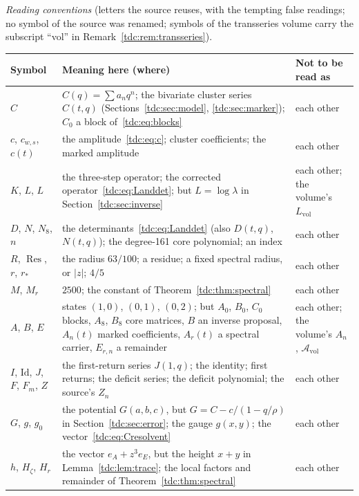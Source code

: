 \documentclass[11pt]{article}
\theoremstyle{definition}\newtheorem{definition}[theorem]{Definition}
\theoremstyle{remark}\newtheorem{remark}[theorem]{Remark}
\newcommand{\Id}{\mathrm{Id}}
\DeclareMathOperator{\Res}{Res}
\begin{document}
\medskip
\begingroup\small
\noindent\emph{Reading conventions} (letters the source reuses, with the
tempting false readings; no symbol of the source was renamed; symbols of the
transseries volume carry the subscript ``vol'' in
Remark~\ref{tdc:rem:transseries}).\par\smallskip
\renewcommand{\arraystretch}{1.1}
\begin{longtable}{@{}>{\raggedright\arraybackslash}p{0.95in}>{\raggedright\arraybackslash}p{3.3in}>{\raggedright\arraybackslash}p{1.85in}@{}}
\toprule
Symbol & Meaning here (where) & Not to be read as\\
\midrule
\endhead
$C$ & $C(q)=\sum a_nq^n$; the bivariate cluster series $C(t,q)$ (Sections~\ref{tdc:sec:model}, \ref{tdc:sec:marker}); $C_0$ a block of~\eqref{tdc:eq:blocks} & each other\\
$c$, $c_{w,s}$, $c(t)$ & the amplitude~\eqref{tdc:eq:c}; cluster coefficients; the marked amplitude & each other\\
$K$, $L$, $L$ & the three-step operator; the corrected operator~\eqref{tdc:eq:Landdet}; but $L=\log\lambda$ in Section~\ref{tdc:sec:inverse} & each other; the volume's $L_{\mathrm{vol}}$\\
$D$, $N$, $N_8$, $n$ & the determinants~\eqref{tdc:eq:Landdet} (also $D(t,q)$, $N(t,q)$); the degree-161 core polynomial; an index & each other\\
$R$, $\Res$, $r$, $r_*$ & the radius $63/100$; a residue; a fixed spectral radius, or $|z|$; $4/5$ & each other\\
$M$, $M_r$ & $2500$; the constant of Theorem~\ref{tdc:thm:spectral} & each other\\
$A$, $B$, $E$ & states $(1,0)$, $(0,1)$, $(0,2)$; but $A_0$, $B_0$, $C_0$ blocks, $A_8$, $B_8$ core matrices, $B$ an inverse proposal, $A_n(t)$ marked coefficients, $A_r(t)$ a spectral carrier, $E_{r,n}$ a remainder & each other; the volume's $A_n$, $\mathcal A_{\mathrm{vol}}$\\
$I$, $\Id$, $J$, $F$, $F_m$, $Z$ & the first-return series $J(1,q)$; the identity; first returns; the deficit series; the deficit polynomial; the source's $Z_n$ & each other\\
$G$, $g$, $g_0$ & the potential $G(a,b,c)$, but $G=C-c/(1-q/\rho)$ in Section~\ref{tdc:sec:error}; the gauge $g(x,y)$; the vector~\eqref{tdc:eq:Cresolvent} & each other\\
$h$, $H_\zeta$, $H_r$ & the vector $e_A+z^3e_E$, but the height $x+y$ in Lemma~\ref{tdc:lem:trace}; the local factors and remainder of Theorem~\ref{tdc:thm:spectral} & each other\\

\end{longtable}
\end{document}
